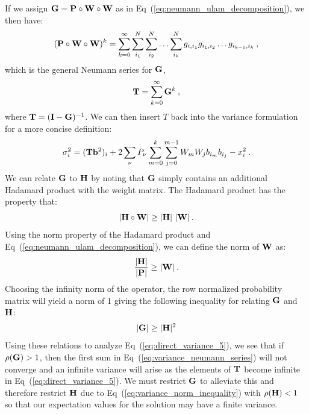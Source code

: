 If we assign $\mathbf{G} = \mathbf{P} \circ \mathbf{W} \circ \mathbf{W}$ as in
Eq~(\ref{eq:neumann_ulam_decomposition}), we then have:
\begin{equation}
   (\mathbf{P} \circ \mathbf{W} \circ \mathbf{W})^k =
  \sum_{k=0}^{\infty}\sum_{i_1}^{N}\sum_{i_2}^{N}\ldots
  \sum_{i_k}^{N}g_{i,i_1}g_{i_1,i_2}\ldots g_{i_{k-1},i_k}\:,
  \label{eq:direct_variance_6}
\end{equation}
which is the general Neumann series for $\mathbf{G}$,
\begin{equation}
  \mathbf{T} = \sum_{k=0}^{\infty} \mathbf{G}^k\:,
  \label{eq:variance_neumann_series}
\end{equation}
where $\mathbf{T} = (\mathbf{I}-\mathbf{G})^{-1}$. We can then insert $T$ back
into the variance formulation for a more concise definition:
\begin{equation}
  \sigma^2_i = (\mathbf{T}\mathbf{b}^2)_i + 2 \sum_{\nu} P_{\nu} \sum_{m=0}^k
  \sum_{j=0}^{m-1} W_m W_j b_{i_m} b_{i_j} - x_i^2\:.
  \label{eq:direct_variance_5}
\end{equation}
We can relate $\mathbf{G}$ to $\mathbf{H}$ by noting that $\mathbf{G}$ simply
contains an additional Hadamard product with the weight matrix. The
Hadamard product has the property that:
\begin{equation}
  |\mathbf{H} \circ \mathbf{W}| \geq |\mathbf{H}|\ |\mathbf{W}|\:.
  \label{eq:hadamard_inequality}
\end{equation}
Using the norm property of the Hadamard product and
Eq~(\ref{eq:neumann_ulam_decomposition}), we can define the norm of
$\mathbf{W}$ as:
\begin{equation}
  \frac{|\mathbf{H}|}{|\mathbf{P}|} \geq |\mathbf{W}|\:.
  \label{eq:weight_norm}
\end{equation}
Choosing the infinity norm of the operator, the row normalized
probability matrix will yield a norm of 1 giving the following
inequality for relating $\mathbf{G}$ and $\mathbf{H}$:
\begin{equation}
  |\mathbf{G}| \geq |\mathbf{H}|^2
  \label{eq:variance_norm_inequality}
\end{equation}
Using these relations to analyze Eq~(\ref{eq:direct_variance_5}), we
see that if $\rho(\mathbf{G}) > 1$, then the first sum in
Eq~(\ref{eq:variance_neumann_series}) will not converge and an
infinite variance will arise as the elements of $\mathbf{T}$ become
infinite in Eq~(\ref{eq:direct_variance_5}). We must restrict $\mathbf{G}$
to alleviate this and therefore restrict $\mathbf{H}$ due to
Eq~(\ref{eq:variance_norm_inequality}) with $\rho(\mathbf{H}) < 1$ so that
our expectation values for the solution may have a finite variance.

